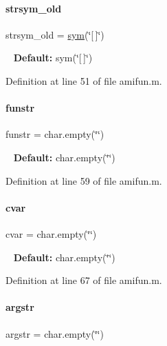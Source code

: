 \mbox{\label{classamifun_ac42759baa6575c9d39f487be5a2e01a1}} 
\paragraph{\texorpdfstring{strsym\+\_\+old}{strsym\_old}}
{\footnotesize\ttfamily strsym\+\_\+old = \mbox{\hyperlink{classamifun_a3c48fff3d28406486a4f1b5e18da7ca6}{sym}}(\char`\"{}\mbox{[}$\,$\mbox{]}\char`\"{})}

~\newline
{\bfseries Default\+:} sym(\char`\"{}\mbox{[}$\,$\mbox{]}\char`\"{}) 

Definition at line 51 of file amifun.\+m.

\mbox{\label{classamifun_a484b54379bc8b29b6ce65d84966ea4c4}} 
\paragraph{\texorpdfstring{funstr}{funstr}}
{\footnotesize\ttfamily funstr = char.\+empty(\char`\"{}\char`\"{})}

~\newline
{\bfseries Default\+:} char.\+empty(\char`\"{}\char`\"{}) 

Definition at line 59 of file amifun.\+m.

\mbox{\label{classamifun_a716c1ceb8235bc1005b606f777530ede}} 
\paragraph{\texorpdfstring{cvar}{cvar}}
{\footnotesize\ttfamily cvar = char.\+empty(\char`\"{}\char`\"{})}

~\newline
{\bfseries Default\+:} char.\+empty(\char`\"{}\char`\"{}) 

Definition at line 67 of file amifun.\+m.

\mbox{\label{classamifun_aa3914760f4131288b95f0f23d0fdfa6d}} 
\paragraph{\texorpdfstring{argstr}{argstr}}
{\footnotesize\ttfamily argstr = char.\+empty(\char`\"{}\char`\"{})}

